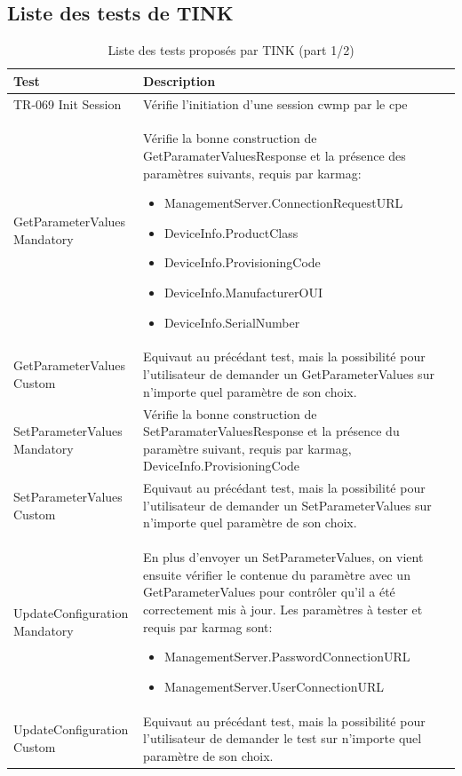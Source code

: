 \documentclass[12pt,a4paper]{report}
\begin{document}
\begin{appendix}
\chapter{Liste des tests de TINK}
\begin{table}
	\begin{tabularx}{17cm}{|l|X|}
		\hline
		Test & Description\tabularnewline
		\hline
		TR-069 Init Session & Vérifie l'initiation d'une session \gls{cwmp} par le \gls{cpe}\tabularnewline
		\hline
		GetParameterValues Mandatory & Vérifie la bonne construction de GetParamaterValuesResponse et la présence des paramètres suivants, requis par \gls{karmag}: 
		\begin{itemize}
		\item ManagementServer.ConnectionRequestURL
		\item DeviceInfo.ProductClass
		\item DeviceInfo.ProvisioningCode
		\item DeviceInfo.ManufacturerOUI
		\item DeviceInfo.SerialNumber
		\end{itemize}		\tabularnewline		
		\hline
		GetParameterValues Custom & Equivaut au précédant test, mais la possibilité pour l'utilisateur de demander un GetParameterValues sur n'importe quel paramètre de son choix.\tabularnewline
		\hline
		SetParameterValues Mandatory & Vérifie la bonne construction de SetParamaterValuesResponse et la présence du paramètre suivant, requis par \gls{karmag}, DeviceInfo.ProvisioningCode\tabularnewline
		\hline
		SetParameterValues Custom & Equivaut au précédant test, mais la possibilité pour l'utilisateur de demander un SetParameterValues sur n'importe quel paramètre de son choix.\tabularnewline
		\hline
		UpdateConfiguration Mandatory & En plus d'envoyer un SetParameterValues, on vient ensuite vérifier le contenue du paramètre avec un GetParameterValues pour contrôler qu'il a été correctement mis à jour. Les paramètres à tester et requis par \gls{karmag} sont: 
		\begin{itemize}
		\item ManagementServer.PasswordConnectionURL
		\item ManagementServer.UserConnectionURL
		\end{itemize} \tabularnewline
		\hline
		UpdateConfiguration Custom & Equivaut au précédant test, mais la possibilité pour l'utilisateur de demander le test sur n'importe quel paramètre de son choix.\tabularnewline
		\hline
		\hline
		\end{tabularx}
	\centering
	\caption{Liste des tests proposés par TINK (part 1/2)}
\end{table}


\end{appendix}
\end{document}
